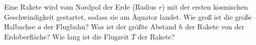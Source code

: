 \begin{Exercise}[title = Ballistische Rakete, origin = J. Kaalda, difficulty = 4, label = cmellipse]
	Eine Rakete wird vom Nordpol der Erde (Radius $r$) mit der ersten kosmischen Geschwindigkeit gestartet, sodass sie am Äquator landet. 
	\Question Wie groß ist die große Halbachse $a$ der Flugbahn?
	\Question Was ist der größte Abstand $h$ der Rakete von der Erdoberfläche?
	\Question Wie lang ist die Flugzeit $T$ der Rakete?
\end{Exercise}
